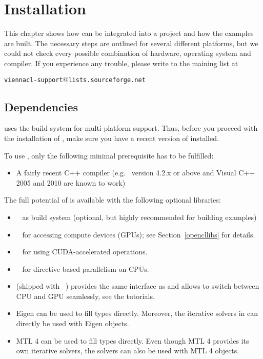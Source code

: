 \chapter{Installation}

This chapter shows how {\ViennaCL} can be integrated into a project and how the
examples are built. The necessary steps are outlined for several different
platforms, but we could not check every possible combination of hardware,
operating system and compiler. If you experience any trouble, please write to
the maining list at \\
\begin{center}
\texttt{viennacl-support$@$lists.sourceforge.net}
\end{center}


\section{Dependencies}
\label{dependencies}
{\ViennaCL} uses the {\CMake} build system for multi-platform support.
Thus, before you proceed with the installation of {\ViennaCL}, make sure you
have a recent version of {\CMake} installed.

To use {\ViennaCL}, only the following minimal prerequisite has to be fulfilled:
\begin{itemize}
 \item A fairly recent C++ compiler (e.g.~{\GCC} version 4.2.x or above and Visual C++
2005 and 2010 are known to work)
\end{itemize}


The full potential of {\ViennaCL} is available with the following optional libraries:
\begin{itemize}
 \item {\CMake}~\cite{cmake} as build system (optional, but highly recommended for building examples)
 \item {\OpenCL}~\cite{khronoscl,nvidiacl} for accessing compute devices (GPUs); see Section~\ref{opencllibs} for details.
 \item {\CUDA}~\cite{nvidiacuda} for using CUDA-accelerated operations.
 \item {\OpenMP}~\cite{openmp} for directive-based parallelism on CPUs.
 \item {\ublas} (shipped with {\Boost}~\cite{boost}) provides the same interface as {\ViennaCL} and allows to switch between CPU and GPU seamlessly, see the tutorials.
 \item Eigen \cite{eigen} can be used to fill {\ViennaCL} types directly. Moreover, the iterative solvers in {\ViennaCL} can directly be used with Eigen objects.
 \item MTL 4 \cite{mtl4} can be used to fill {\ViennaCL} types directly. Even though MTL 4 provides its own iterative solvers, the {\ViennaCL} solvers can also be used with MTL 4 objects.
\end{itemize}

